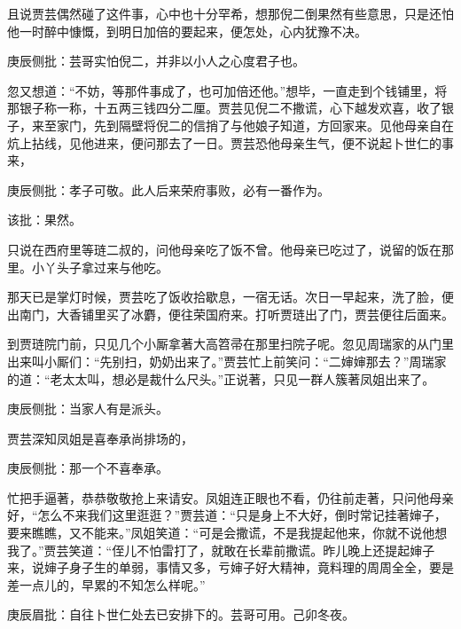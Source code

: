 \begin{parag}
    且说贾芸偶然碰了这件事，心中也十分罕希，想那倪二倒果然有些意思，只是还怕他一时醉中慷慨，到明日加倍的要起来，便怎处，心内犹豫不决。\begin{note}庚辰侧批：芸哥实怕倪二，并非以小人之心度君子也。\end{note}忽又想道：“不妨，等那件事成了，也可加倍还他。”想毕，一直走到个钱铺里，将那银子称一称，十五两三钱四分二厘。贾芸见倪二不撒谎，心下越发欢喜，收了银子，来至家门，先到隔壁将倪二的信捎了与他娘子知道，方回家来。见他母亲自在炕上拈线，见他进来，便问那去了一日。贾芸恐他母亲生气，便不说起卜世仁的事来，\begin{note}庚辰侧批：孝子可敬。此人后来荣府事败，必有一番作为。\end{note}\begin{note}该批：果然。\end{note}只说在西府里等琏二叔的，问他母亲吃了饭不曾。他母亲已吃过了，说留的饭在那里。小丫头子拿过来与他吃。
\end{parag}


\begin{parag}
    那天已是掌灯时候，贾芸吃了饭收拾歇息，一宿无话。次日一早起来，洗了脸，便出南门，大香铺里买了冰麝，便往荣国府来。打听贾琏出了门，贾芸便往后面来。
\end{parag}


\begin{parag}
    到贾琏院门前，只见几个小厮拿著大高笤帚在那里扫院子呢。忽见周瑞家的从门里出来叫小厮们：“先别扫，奶奶出来了。”贾芸忙上前笑问：“二婶婶那去？”周瑞家的道：“老太太叫，想必是裁什么尺头。”正说著，只见一群人簇著凤姐出来了。\begin{note}庚辰侧批：当家人有是派头。\end{note}贾芸深知凤姐是喜奉承尚排场的，\begin{note}庚辰侧批：那一个不喜奉承。\end{note}忙把手逼著，恭恭敬敬抢上来请安。凤姐连正眼也不看，仍往前走著，只问他母亲好，“怎么不来我们这里逛逛？”贾芸道：“只是身上不大好，倒时常记挂著婶子，要来瞧瞧，又不能来。”凤姐笑道：“可是会撒谎，不是我提起他来，你就不说他想我了。”贾芸笑道：“侄儿不怕雷打了，就敢在长辈前撒谎。昨儿晚上还提起婶子来，说婶子身子生的单弱，事情又多，亏婶子好大精神，竟料理的周周全全，要是差一点儿的，早累的不知怎么样呢。”\begin{note}庚辰眉批：自往卜世仁处去已安排下的。芸哥可用。己卯冬夜。\end{note}
\end{parag}


